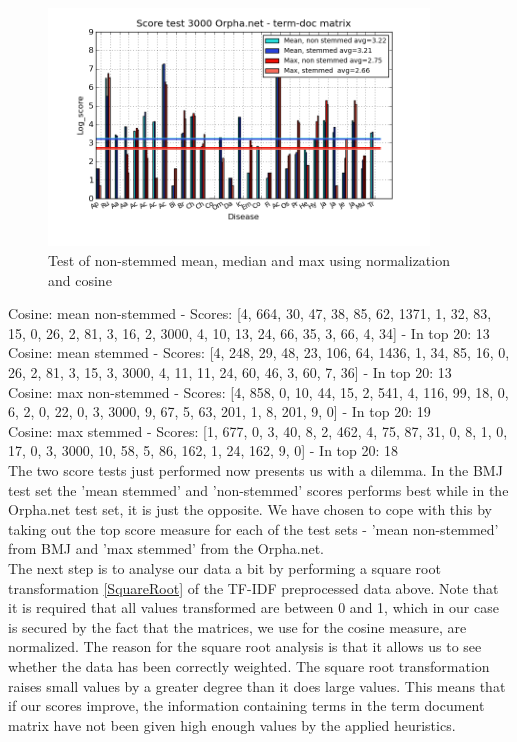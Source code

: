 \begin{figure}[h!]
        \begin{center}
          \includegraphics[width=0.9\textwidth]{barcharts/termDoc_orphan_hist_3000_ns_mea_s_mea_ns_max_s_max.png}
        \end{center}
        \caption{Test of non-stemmed mean, median and max using normalization and cosine}
        \label{termDoc_orphan_hist_3000_ns_mea_s_mea_ns_max_s_max}
\end{figure}
{\small
Cosine: mean non-stemmed - Scores: [4, 664, 30, 47, 38, 85, 62, 1371, 1, 32, 83, 15, 0, 26, 2, 81, 3, 16, 2, 3000, 4, 10, 13, 24, 66, 35, 3, 66, 4, 34] - In top 20: 13 \\
Cosine: mean stemmed - Scores: [4, 248, 29, 48, 23, 106, 64, 1436, 1, 34, 85, 16, 0, 26, 2, 81, 3, 15, 3, 3000, 4, 11, 11, 24, 60, 46, 3, 60, 7, 36] - In top 20: 13 \\
Cosine: max non-stemmed - Scores: [4, 858, 0, 10, 44, 15, 2, 541, 4, 116, 99, 18, 0, 6, 2, 0, 22, 0, 3, 3000, 9, 67, 5, 63, 201, 1, 8, 201, 9, 0] - In top 20: 19 \\
Cosine: max stemmed - Scores: [1, 677, 0, 3, 40, 8, 2, 462, 4, 75, 87, 31, 0, 8, 1, 0, 17, 0, 3, 3000, 10, 58, 5, 86, 162, 1, 24, 162, 9, 0] - In top 20: 18 \\
}
The two score tests just performed now presents us with a dilemma. In the BMJ test set the 'mean stemmed' and 'non-stemmed' scores performs best while in the Orpha.net test set, it is just the opposite. We have chosen to cope with this by taking out the top score measure for each of the test sets - 'mean non-stemmed' from BMJ and 'max stemmed' from the Orpha.net. \\

The next step is to analyse our data a bit by performing a square root transformation \ref{SquareRoot} of the TF-IDF preprocessed data above. Note that it is required that all values transformed are between 0 and 1, which in our case is secured by the fact that the matrices, we use for the cosine measure, are normalized. The reason for the square root analysis is that it allows us to see whether the data has been correctly weighted. The square root transformation raises small values by a greater degree than it does large values. This means that if our scores improve, the information containing terms in the term document matrix have not been given high enough values by the applied heuristics. \\

